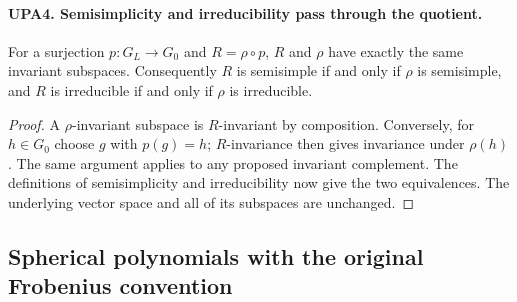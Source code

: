 \documentclass[11pt,a4paper]{article}
\numberwithin{equation}{section}
\theoremstyle{remark}\newtheorem{remark}[theorem]{Remark}
\begin{document}
\paragraph{UPA4. Semisimplicity and irreducibility pass through the quotient.}
\label{claim:UPA4}
For a surjection $p:G_L\to G_0$ and $R=\rho\circ p$,
$R$ and $\rho$ have exactly the same invariant subspaces.
Consequently $R$ is semisimple if and only if $\rho$ is
semisimple, and $R$ is irreducible if and only if $\rho$
is irreducible.
\begin{proof}
A $\rho$-invariant subspace is $R$-invariant by composition.
Conversely, for $h\in G_0$ choose $g$ with $p(g)=h$;
$R$-invariance then gives invariance under $\rho(h)$.
The same argument applies to any proposed invariant
complement.  The definitions of semisimplicity and
irreducibility now give the two equivalences.  The
underlying vector space and all of its subspaces are
unchanged.
\end{proof}

\subsection{Spherical polynomials with the original Frobenius convention}

\end{document}
